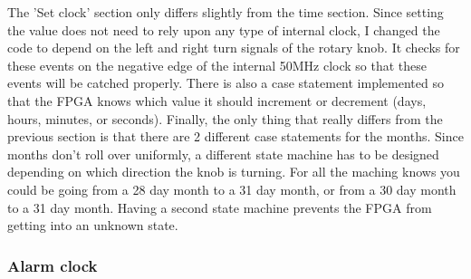 \documentclass[12pt,a4paper,hidelinks]{article}            %
\begin{document}
The 'Set clock' section only differs slightly from the time section. Since setting the value does not need to rely upon any type of internal clock, I changed the code to depend on the left and right turn signals of the rotary knob. It checks for these events on the negative edge of the internal 50MHz clock so that these events will be catched properly. There is also a case statement implemented so that the FPGA knows which value it should increment or decrement (days, hours, minutes, or seconds). Finally, the only thing that really differs from the previous section is that there are 2 different case statements for the months. Since months don't roll over uniformly, a different state machine has to be designed depending on which direction the knob is turning. For all the maching knows you could be going from a 28 day month to a 31 day month, or from a 30 day month to a 31 day month. Having a second state machine prevents the FPGA from getting into an unknown state.

\subsubsection{Alarm clock}
\end{document}

